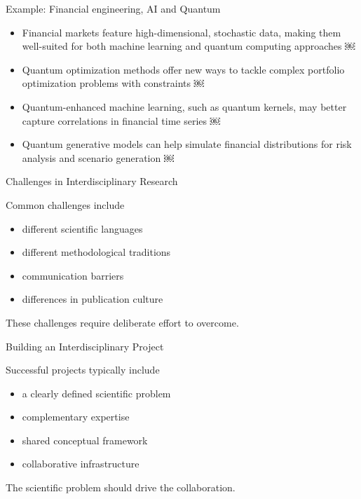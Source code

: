 \documentclass{beamer}
\begin{document}
\begin{frame}{Example: Financial engineering, AI and Quantum}


\begin{itemize}
\item Financial markets feature high-dimensional, stochastic data, making them well-suited for both machine learning and quantum computing approaches  ￼
\item Quantum optimization methods offer new ways to tackle complex portfolio optimization problems with constraints  ￼
\item Quantum-enhanced machine learning, such as quantum kernels, may better capture correlations in financial time series  ￼
\item Quantum generative models can help simulate financial distributions for risk analysis and scenario generation  ￼
\end{itemize}

\end{frame}




\begin{frame}{Challenges in Interdisciplinary Research}

Common challenges include

\begin{itemize}
\item different scientific languages
\item different methodological traditions
\item communication barriers
\item differences in publication culture
\end{itemize}

These challenges require deliberate effort
to overcome.

\end{frame}


\begin{frame}{Building an Interdisciplinary Project}

Successful projects typically include

\begin{itemize}
\item a clearly defined scientific problem
\item complementary expertise
\item shared conceptual framework
\item collaborative infrastructure
\end{itemize}

The scientific problem should drive the collaboration.

\end{frame}
\end{document}
